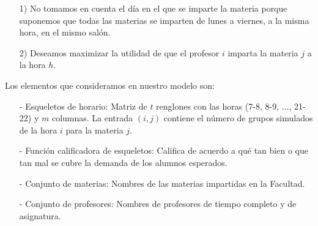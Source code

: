 \begin{enumerate}
\item[1)] No tomamos en cuenta el día en el que se imparte la materia porque suponemos que todas las materias se imparten de lunes a viernes, a la misma hora, en el mismo salón.

\item[2)] Deseamos maximizar la utilidad de que el profesor $i$ imparta la materia $j$ a la hora $h$.
\end{enumerate}

  
  Los elementos que consideramos en nuestro modelo son:
  
  \begin{itemize}
\item[-] Esqueletos de horario: Matriz de $t$ renglones con las horas (7-8, 8-9, $\ldots$, 21-22) y $m$ columnas. La entrada $(i,j)$ contiene el número de grupos simulados de la hora $i$ para la materia $j$.

\item[-] Función calificadora de esqueletos: Califica de acuerdo a qué tan bien o que tan mal se cubre la demanda de los alumnos esperados.

\item[-] Conjunto de materias: Nombres de las materias impartidas en la Facultad.

\item[-] Conjunto de profesores: Nombres de profesores de tiempo completo y de asignatura.
\end{itemize}


